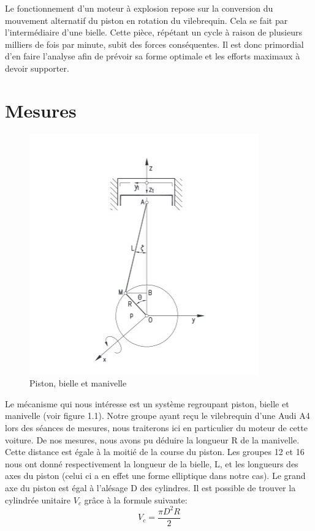 \documentclass[a4paper,oneside,12pt]{report}
\begin{document}
Le fonctionnement d'un moteur à explosion repose sur la conversion du mouvement alternatif du piston en rotation du vilebrequin. Cela se fait par l'intermédiaire d'une bielle. Cette pièce, répétant un cycle à raison de plusieurs milliers de fois par minute, subit des forces conséquentes. Il est donc primordial d'en faire l'analyse afin de prévoir sa forme optimale et les efforts maximaux à devoir supporter. 

\section{Mesures}

\begin{figure}	
	\center
	\includegraphics[scale=0.75]{Dessin.jpg}
	\caption{Piston, bielle et manivelle}
\end{figure}

Le mécanisme qui nous intéresse est un système regroupant piston, bielle et manivelle (voir figure 1.1). Notre groupe ayant reçu le vilebrequin d'une Audi A4 lors des séances de mesures, nous traiterons ici en particulier du moteur de cette voiture. De nos mesures, nous avons pu déduire la longueur R de la manivelle. Cette distance est égale à la moitié de la course du piston. Les groupes 12 et 16 nous ont donné respectivement la longueur de la bielle, L, et les longueurs des axes du piston (celui ci a en effet une forme elliptique dans notre cas). Le grand axe du piston est égal à l'alésage D des cylindres. Il est possible de trouver la cylindrée unitaire $V_c$ grâce à la formule suivante: 
$$V_c =\frac{\pi D^2 R}{2}$$
\end{document}
